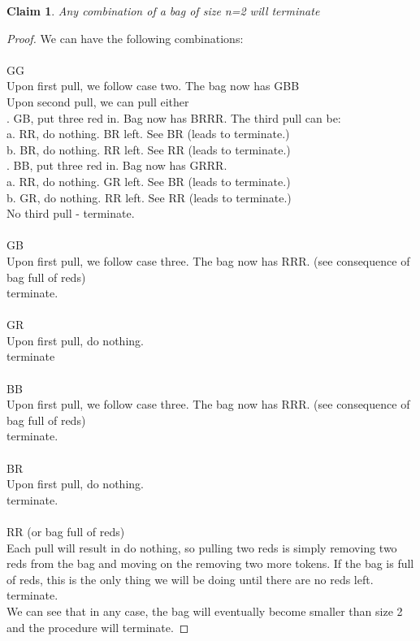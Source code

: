 \documentclass[11pt]{article}
\newtheorem{claim}[theorem]{Claim}
\begin{document}
	\begin{claim} 
		Any combination of a bag of size n=2 will terminate
	\end{claim}
	\begin{proof}
		We can have the following combinations:\\
		\\
		GG\\
		Upon first pull, we follow case two. The bag now has GBB\\
		Upon second pull, we can pull either\\
		. GB, put three red in. Bag now has BRRR. The third pull can be:\\
		\indent \indent a. RR, do nothing. BR left. See BR (leads to terminate.)\\
		\indent \indent b. BR, do nothing. RR left. See RR (leads to terminate.)\\
		. BB, put three red in. Bag now has GRRR.\\
		\indent \indent a. RR, do nothing. GR left. See BR (leads to terminate.)\\
		\indent \indent b. GR, do nothing. RR left. See RR (leads to terminate.)\\
		No third pull - terminate.\\
		\\		
		GB\\
		Upon first pull, we follow case three. The bag now has RRR. (see consequence of bag full of reds)\\
		terminate.\\
		\\
		GR\\
		Upon first pull, do nothing.\\
		terminate\\
		\\
		BB\\
		Upon first pull, we follow case three. The bag now has RRR. (see consequence of bag full of reds)\\
		terminate.\\
		\\
		BR\\
		Upon first pull, do nothing.\\
		terminate.\\
		\\
		RR (or bag full of reds)\\
		Each pull will result in do nothing, so pulling two reds is simply removing two reds from the bag and moving on the removing two more tokens. If the bag is full of reds, this is the only thing we will be doing until there are no reds left. \\
		terminate.\\
		
		We can see that in any case, the bag will eventually become smaller than size 2 and the procedure will terminate. 
		
	\end{proof}
\end{document}
